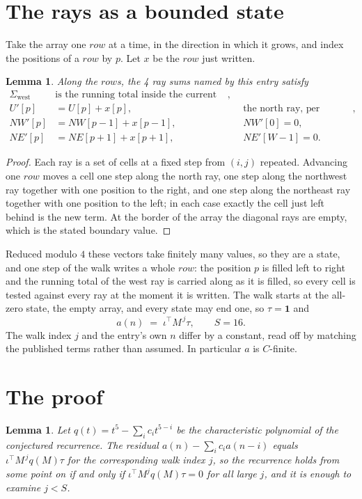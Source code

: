 \documentclass[11pt,a4paper]{article}
\theoremstyle{plain}
\newtheorem{lemma}[theorem]{Lemma}
\theoremstyle{definition}
\begin{document}
\section{The rays as a bounded state}

Take the array one $row$ at a time, in the direction in which it grows, and index the
positions of a $row $ by $p$. Let $x$ be the $row$ just written.

\begin{lemma}\label{lem:rays}
Along the $row$s, the 4 ray sums named by this entry satisfy
\[
\begin{aligned}
\Sigma_{\mathrm{west}}\ &\text{is the running total inside the current row},\\
U'[p]&=U[p]+x[p], &&\text{the north ray, per position},\\
NW'[p]&=NW[p-1]+x[p-1], && NW'[0]=0,\\
NE'[p]&=NE[p+1]+x[p+1], && NE'[W-1]=0 .
\end{aligned}
\]
\end{lemma}

\begin{proof}
Each ray is a set of cells at a fixed step from $(i,j)$ repeated. Advancing one $row$
moves a cell one step along the north ray, one step along the northwest ray together with one
position to the right, and one step along the northeast ray together with one position to the
left; in each case exactly the cell just left behind is the new term. At the border of the
array the diagonal rays are empty, which is the stated boundary value.
\end{proof}

Reduced modulo $4$ these vectors take finitely many values, so they are a state, and one step
of the walk writes a whole $row$: the position $p$ is filled left to right and the
running total of the west ray is carried along as it is filled, so every cell is tested
against every ray at the moment it is written. The walk starts at the all-zero state, the empty
array, and every state may end one, so $\tau=\mathbf{1}$ and
\[
a(n)\;=\;\iota^{\!\top}M^{\,j}\tau ,\qquad S=16.
\]
The walk index $j$ and the entry's own $n$ differ by a constant, read off by matching the
published terms rather than assumed. In particular $a$ is $C$-finite.

\section{The proof}

\begin{lemma}\label{lem:crit}
Let $q(t)=t^{5}-\sum_i c_it^{5-i}$ be the characteristic polynomial of the
conjectured recurrence. The residual $a(n)-\sum_ic_ia(n-i)$ equals
$\iota^{\!\top}M^{\,j}q(M)\tau$ for the corresponding walk index $j$, so the recurrence
holds from some point on if and only if $\iota^{\!\top}M^{j}q(M)\tau=0$ for all large $j$,
and it is enough to examine $j<S$.
\end{lemma}
\end{document}
